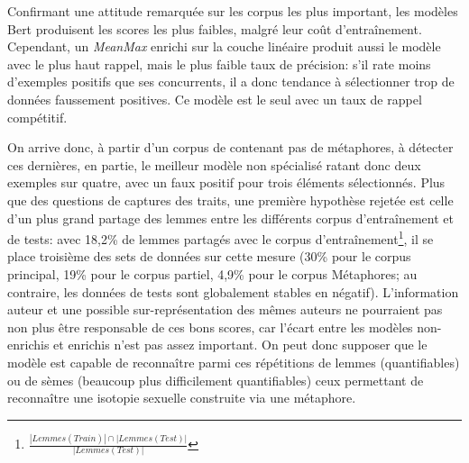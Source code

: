 Confirmant une attitude remarquée sur les corpus les plus important, les modèles Bert produisent les scores les plus faibles, malgré leur coût d'entraînement. Cependant, un \textit{MeanMax} enrichi sur la couche linéaire produit aussi le modèle avec le plus haut rappel, mais le plus faible taux de précision: s'il rate moins d'exemples positifs que ses concurrents, il a donc tendance à sélectionner trop de données faussement positives. Ce modèle est le seul avec un taux de rappel compétitif.

On arrive donc, à partir d'un corpus de contenant pas de métaphores, à détecter ces dernières, en partie, le meilleur modèle non spécialisé ratant donc deux exemples sur quatre, avec un faux positif pour trois éléments sélectionnés. Plus que des questions de captures des traits, une première hypothèse rejetée est celle d'un plus grand partage des lemmes entre les différents corpus d'entraînement et de tests: avec 18,2\% de lemmes partagés avec le corpus d'entraînement\footnote{$\frac{|Lemmes(Train)| \cap |Lemmes(Test)|}{|Lemmes(Test)|}$}, il se place troisième des sets de données sur cette mesure (30\% pour le corpus principal, 19\% pour le corpus partiel, 4,9\% pour le corpus Métaphores; au contraire, les données de tests sont globalement stables en négatif). L'information auteur et une possible sur-représentation des mêmes auteurs ne pourraient pas non plus être responsable de ces bons scores, car l'écart entre les modèles non-enrichis et enrichis n'est pas assez important. On peut donc supposer que le modèle est capable de reconnaître parmi ces répétitions de lemmes (quantifiables) ou de sèmes (beaucoup plus difficilement quantifiables) ceux permettant de reconnaître une isotopie sexuelle construite via une métaphore.

